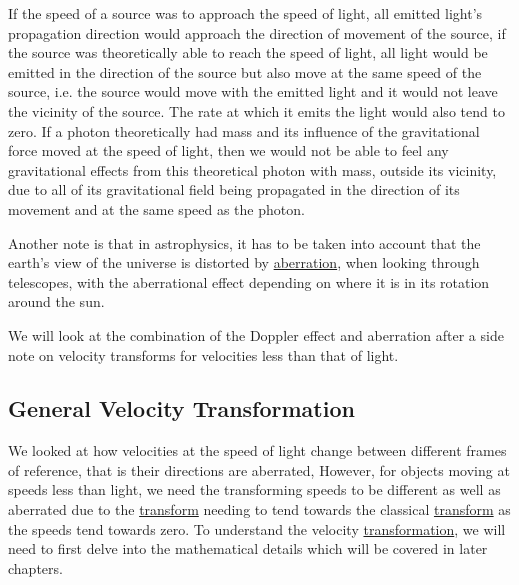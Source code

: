 
If the speed of a source was to approach the speed of light, all emitted light's propagation direction would approach the direction of movement of the source, if the source was theoretically able to reach the speed of light, all light would be emitted in the direction of the source but also move at the same speed of the source, i.e. the source would move with the emitted light and it would not leave the vicinity of the source. The rate at which it emits the light would also tend to zero. If a photon theoretically had mass and its influence of the gravitational force moved at the speed of light, then we would not be able to feel any gravitational effects from this theoretical photon with mass, outside its vicinity, due to all of its gravitational field being propagated in the direction of its movement and at the same speed as the photon.

Another note is that in astrophysics, it has to be taken into account that the earth's view of the universe is distorted by \hyperlink{def-aberration}{aberration}, when looking through telescopes, with the aberrational effect depending on where it is in its rotation around the sun.

We will look at the combination of the Doppler effect and aberration after a side note on velocity transforms for velocities less than that of light.


\subsection{General Velocity Transformation}

We looked at how velocities at the speed of light change between different frames of reference, that is their directions are aberrated, However, for objects moving at speeds less than light, we need the transforming speeds to be different as well as aberrated due to the \hyperlink{def-transform}{transform} needing to tend towards the classical \hyperlink{def-transform}{transform} as the speeds tend towards zero. To understand the velocity \hyperlink{def-transform}{transformation}, we will need to first delve into the mathematical details which will be covered in later chapters.

